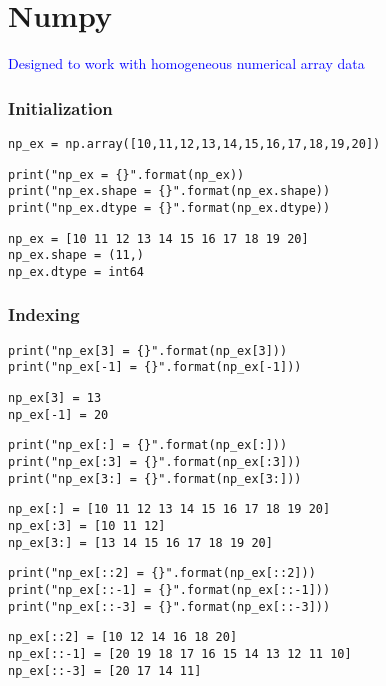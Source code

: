 \section{Numpy}

\textcolor{blue}{Designed to work with homogeneous numerical array data}


\subsubsection{Initialization}

\begin{lstlisting}[style=pyInStyle]
np_ex = np.array([10,11,12,13,14,15,16,17,18,19,20])
\end{lstlisting}

\begin{lstlisting}[style=pyInStyle]
print("np_ex = {}".format(np_ex))
print("np_ex.shape = {}".format(np_ex.shape))
print("np_ex.dtype = {}".format(np_ex.dtype))
\end{lstlisting}
\begin{lstlisting}[style=pyOutStyle]
np_ex = [10 11 12 13 14 15 16 17 18 19 20]
np_ex.shape = (11,)
np_ex.dtype = int64
\end{lstlisting}

\subsubsection{Indexing}

\begin{lstlisting}[style=pyInStyle]
print("np_ex[3] = {}".format(np_ex[3]))
print("np_ex[-1] = {}".format(np_ex[-1]))
\end{lstlisting}
\begin{lstlisting}[style=pyOutStyle]
np_ex[3] = 13
np_ex[-1] = 20
\end{lstlisting}

\begin{lstlisting}[style=pyInStyle]
print("np_ex[:] = {}".format(np_ex[:]))
print("np_ex[:3] = {}".format(np_ex[:3]))
print("np_ex[3:] = {}".format(np_ex[3:]))
\end{lstlisting}
\begin{lstlisting}[style=pyOutStyle]
np_ex[:] = [10 11 12 13 14 15 16 17 18 19 20]
np_ex[:3] = [10 11 12]
np_ex[3:] = [13 14 15 16 17 18 19 20]
\end{lstlisting}

\begin{lstlisting}[style=pyInStyle]
print("np_ex[::2] = {}".format(np_ex[::2]))
print("np_ex[::-1] = {}".format(np_ex[::-1]))
print("np_ex[::-3] = {}".format(np_ex[::-3]))
\end{lstlisting}
\begin{lstlisting}[style=pyOutStyle]
np_ex[::2] = [10 12 14 16 18 20]
np_ex[::-1] = [20 19 18 17 16 15 14 13 12 11 10]
np_ex[::-3] = [20 17 14 11]
\end{lstlisting}


